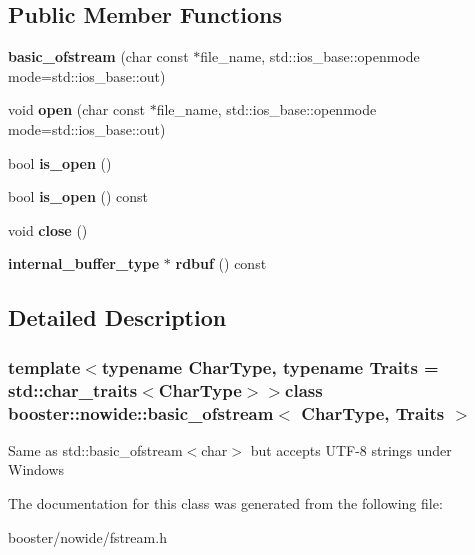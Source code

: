 \subsection*{Public Member Functions}
\begin{DoxyCompactItemize}
\item 
{\bfseries basic\-\_\-ofstream} (char const $\ast$file\-\_\-name, std\-::ios\-\_\-base\-::openmode mode=std\-::ios\-\_\-base\-::out)\label{classbooster_1_1nowide_1_1basic__ofstream_ad179dbb18e7d03ac16e49860b53d8d06}

\item 
void {\bfseries open} (char const $\ast$file\-\_\-name, std\-::ios\-\_\-base\-::openmode mode=std\-::ios\-\_\-base\-::out)\label{classbooster_1_1nowide_1_1basic__ofstream_a7c0bbc97ff23f14759536c32777a643f}

\item 
bool {\bfseries is\-\_\-open} ()\label{classbooster_1_1nowide_1_1basic__ofstream_aee64c68ef40f50491942f3b67bb25d3c}

\item 
bool {\bfseries is\-\_\-open} () const \label{classbooster_1_1nowide_1_1basic__ofstream_afbaf63149f90c1f8b07dd00d602f8470}

\item 
void {\bfseries close} ()\label{classbooster_1_1nowide_1_1basic__ofstream_ad7b1e793f9519061b9afca86e6eb587d}

\item 
{\bf internal\-\_\-buffer\-\_\-type} $\ast$ {\bfseries rdbuf} () const \label{classbooster_1_1nowide_1_1basic__ofstream_a339a5fe76e56123ae0095ca98f016866}

\end{DoxyCompactItemize}


\subsection{Detailed Description}
\subsubsection*{template$<$typename Char\-Type, typename Traits = std\-::char\-\_\-traits$<$\-Char\-Type$>$$>$class booster\-::nowide\-::basic\-\_\-ofstream$<$ Char\-Type, Traits $>$}

Same as std\-::basic\-\_\-ofstream$<$char$>$ but accepts U\-T\-F-\/8 strings under Windows 

The documentation for this class was generated from the following file\-:\begin{DoxyCompactItemize}
\item 
booster/nowide/fstream.\-h\end{DoxyCompactItemize}
